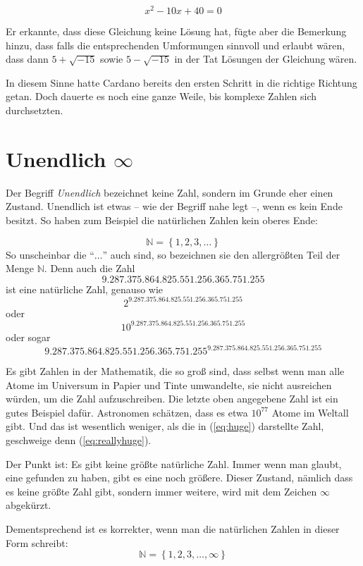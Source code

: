 \[ x^2-10x+40=0 \]

Er erkannte, dass diese Gleichung keine Lösung hat, fügte aber die Bemerkung hinzu, dass falls die entsprechenden Umformungen sinnvoll und erlaubt wären, dass dann $5+\sqrt{-15}$ sowie $5-\sqrt{-15} $ in der Tat Lösungen der Gleichung wären. 

In diesem Sinne hatte Cardano bereits den ersten Schritt in die richtige Richtung getan. Doch dauerte es noch eine ganze Weile, bis komplexe Zahlen sich durchsetzten.


\section{Unendlich $\infty$}

Der Begriff \textsl{Unendlich} bezeichnet keine Zahl, sondern im Grunde eher einen Zustand. Unendlich ist etwas -- wie der Begriff nahe legt --, wenn es kein Ende besitzt. So haben zum Beispiel die natürlichen Zahlen kein oberes Ende:

\[
\mathbb{N} = \left\lbrace 1,2,3, \dots \right\rbrace
\]
So unscheinbar die "`$\dots$"' auch sind, so bezeichnen sie den allergrößten Teil der Menge $\mathbb{N}$. Denn auch die Zahl 
\[9.287.375.864.825.551.256.365.751.255\]
ist eine natürliche Zahl, genauso wie 
\[2^{9.287.375.864.825.551.256.365.751.255}\]
oder
\begin{equation} \label{eq:huge}
10^{9.287.375.864.825.551.256.365.751.255}
\end{equation}
oder sogar
\begin{equation}\label{eq:reallyhuge}
9.287.375.864.825.551.256.365.751.255^{9.287.375.864.825.551.256.365.751.255}
\end{equation}

Es gibt Zahlen in der Mathematik, die so groß sind, dass selbst wenn man alle Atome im Universum in Papier und Tinte umwandelte, sie nicht ausreichen würden, um die Zahl aufzuschreiben. Die letzte oben angegebene Zahl ist ein gutes Beispiel dafür. Astronomen schätzen, dass es etwa $10^{77}$ Atome im Weltall gibt. Und das ist wesentlich weniger, als die in (\ref{eq:huge}) darstellte Zahl, geschweige denn (\ref{eq:reallyhuge}).

Der Punkt ist: Es gibt keine größte natürliche Zahl. Immer wenn man glaubt, eine gefunden zu haben, gibt es eine noch größere. Dieser Zustand, nämlich dass es keine größte Zahl gibt, sondern immer weitere, wird mit dem Zeichen $\infty$ abgekürzt. 

Dementsprechend ist es korrekter, wenn man die natürlichen Zahlen in dieser Form schreibt:
\[
\mathbb{N} = \left\lbrace 1,2,3, \dots, \infty \right\rbrace
\]

